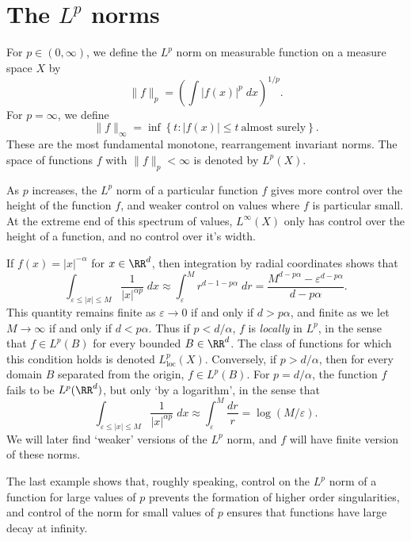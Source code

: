 \section{The $L^p$ norms}

For $p \in (0,\infty)$, we define the $L^p$ norm on measurable function on a measure space $X$ by
%
\[ \| f \|_p = \left( \int |f(x)|^p\; dx \right)^{1/p}. \]
%
For $p = \infty$, we define
%
\[ \| f \|_\infty = \inf \left\{ t: |f(x)| \leq t\ \text{almost surely} \right\}. \]
%
These are the most fundamental monotone, rearrangement invariant norms. The space of functions $f$ with $\| f \|_p < \infty$ is denoted by $L^p(X)$.

As $p$ increases, the $L^p$ norm of a particular function $f$ gives more control over the height of the function $f$, and weaker control on values where $f$ is particular small. At the extreme end of this spectrum of values, $L^\infty(X)$ only has control over the height of a function, and no control over it's width.

\begin{example}
  If $f(x) = |x|^{-\alpha}$ for $x \in \RR^d$, then integration by radial coordinates shows that
  \[ \int_{\varepsilon \leq |x| \leq M} \frac{1}{|x|^{\alpha p}}\; dx \approx \int_\varepsilon^M r^{d-1 - p\alpha}\; dr = \frac{M^{d - p \alpha} - \varepsilon^{d - p \alpha}}{d - p \alpha}. \]
  This quantity remains finite as $\varepsilon \to 0$ if and only if $d > p \alpha$, and finite as we let $M \to \infty$ if and only if $d < p \alpha$. Thus if $p < d/\alpha$, $f$ is \emph{locally} in $L^p$, in the sense that $f \in L^p(B)$ for every bounded $B \in \RR^d$. The class of functions for which this condition holds is denoted $L^p_{\text{loc}}(X)$. Conversely, if $p > d/\alpha$, then for every domain $B$ separated from the origin, $f \in L^p(B)$. For $p = d/\alpha$, the function $f$ fails to be $L^p(\RR^d)$, but only `by a logarithm', in the sense that
  \[ \int_{\varepsilon \leq |x| \leq M} \frac{1}{|x|^{\alpha p}}\; dx \approx \int_\varepsilon^M \frac{dr}{r} = \log(M/\varepsilon). \]
  We will later find `weaker' versions of the $L^p$ norm, and $f$ will have finite version of these norms.
\end{example}

The last example shows that, roughly speaking, control on the $L^p$ norm of a function for large values of $p$ prevents the formation of higher order singularities, and control of the norm for small values of $p$ ensures that functions have large decay at infinity.

